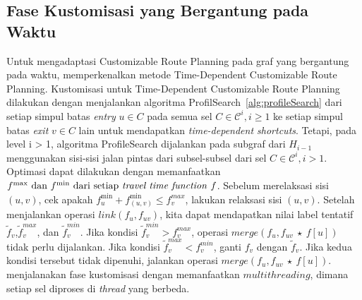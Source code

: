 \subsection{Fase Kustomisasi yang Bergantung pada Waktu}
\label{subsec:tdcrp-timedependent-customization}
Untuk mengadaptasi Customizable Route Planning pada graf yang bergantung pada waktu, \cite{Baum2016} memperkenalkan metode Time-Dependent Customizable Route Planning. Kustomisasi untuk Time-Dependent Customizable Route Planning dilakukan dengan menjalankan algoritma ProfilSearch~\ref{alg:profileSearch} dari setiap simpul batas \textit{entry} $u\in C$ pada semua sel $C\in\mathcal{C}^{i}, i\geq 1$ ke setiap simpul batas \textit{exit} $v\in C$ lain untuk mendapatkan \textit{time-dependent shortcuts}. Tetapi, pada level i > 1, algoritma ProfileSearch dijalankan pada subgraf dari $H_{i-1}$ menggunakan sisi-sisi jalan pintas dari subsel-subsel dari sel $C\in\mathcal{C}^i, i>1$. Optimasi dapat dilakukan dengan memanfaatkan $f^{\max}\text{ dan }f^{\min} \text{ dari setiap \textit{travel time function} } f $. Sebelum merelaksasi sisi $(u,v)$, cek apakah $f_{u}^{\min}+f_{(u,v)}^{\min}\leq f^{max}_v$, lakukan relaksasi sisi $(u,v)$. Setelah menjalankan operasi $link(f_u,f_{uv})$, kita dapat mendapatkan nilai label tentatif $\tilde{f}_v$,$\tilde{f}_v^{max}$, dan $\tilde{f}_v^{min}$. Jika kondisi $\tilde{f}_v^{min}>f_v^{max}$, operasi $merge(f_u,f_{uv}\ \star \ f[u])$ tidak perlu dijalankan. Jika kondisi $\tilde{f}_v^{max}<f_v^{min}$, ganti $f_v$ dengan $\tilde{f}_v$. Jika kedua kondisi tersebut tidak dipenuhi, jalankan operasi $merge(f_u,f_{uv}\ \star \ f[u])$. \cite{Baum2016} menjalanakan fase kustomisasi dengan memanfaatkan $multithreading$, dimana setiap sel diproses di \textit{thread} yang berbeda.


